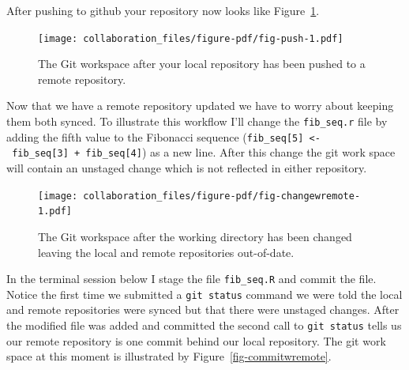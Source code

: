 \documentclass[
  letterpaper,
  DIV=11,
  numbers=noendperiod]{scrreprt}
\begin{document}
After pushing to github your repository now looks like
Figure~\ref{fig-push}.

\begin{figure}

{\centering \texttt{[image: collaboration\_files/figure-pdf/fig-push-1.pdf]}

}

\caption{\label{fig-push}The Git workspace after your local repository
has been pushed to a remote repository.}

\end{figure}

Now that we have a remote repository updated we have to worry about
keeping them both synced. To illustrate this workflow I'll change the
\texttt{fib\_seq.r} file by adding the fifth value to the Fibonacci
sequence
(\texttt{fib\_seq{[}5{]}\ \textless{}-\ fib\_seq{[}3{]}\ +\ fib\_seq{[}4{]}})
as a new line. After this change the git work space will contain an
unstaged change which is not reflected in either repository.

\begin{figure}

{\centering \texttt{[image: collaboration\_files/figure-pdf/fig-changewremote-1.pdf]}

}

\caption{\label{fig-changewremote}The Git workspace after the working
directory has been changed leaving the local and remote repositories
out-of-date.}

\end{figure}

In the terminal session below I stage the file \texttt{fib\_seq.R} and
commit the file. Notice the first time we submitted a
\texttt{git\ status} command we were told the local and remote
repositories were synced but that there were unstaged changes. After the
modified file was added and committed the second call to
\texttt{git\ status} tells us our remote repository is one commit behind
our local repository. The git work space at this moment is illustrated
by Figure~\ref{fig-commitwremote}.
\end{document}
